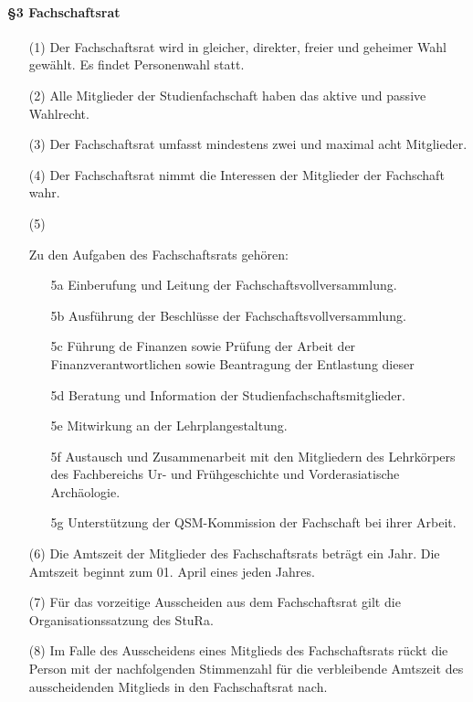     \paragraph{§3 Fachschaftsrat}
    \begin{enumerate}
        \item[(1)] { Der Fachschaftsrat wird in gleicher, direkter, freier und geheimer Wahl gewählt.        Es findet Personenwahl statt.}
        \item[(2)] {Alle Mitglieder der Studienfachschaft haben das aktive und passive Wahlrecht. }
        \item[(3)] {Der Fachschaftsrat umfasst mindestens zwei und maximal acht Mitglieder. }
        \item[(4)] {Der Fachschaftsrat nimmt die Interessen der Mitglieder der Fachschaft wahr. }
        \item[(5)] {Zu den Aufgaben des Fachschaftsrats gehören:
            \begin{enumerate}
                \item[5a]Einberufung und Leitung der Fachschaftsvollversammlung.
                \item[5b]Ausführung der Beschlüsse der Fachschaftsvollversammlung.
                \item[5c]Führung de Finanzen sowie Prüfung der Arbeit der Finanzverantwortlichen sowie Beantragung der Entlastung dieser
                \item[5d]Beratung und Information der Studienfachschaftsmitglieder.
                \item[5e]Mitwirkung an der Lehrplangestaltung.
                \item[5f]Austausch und Zusammenarbeit mit den Mitgliedern des Lehrkörpers des Fachbereichs Ur- und Frühgeschichte und Vorderasiatische Archäologie.
                \item[5g]Unterstützung der QSM-Kommission der Fachschaft bei ihrer Arbeit.
            \end{enumerate}
        }
        \item[(6)] {Die Amtszeit der Mitglieder des Fachschaftsrats beträgt ein Jahr. Die Amtszeit        beginnt zum 01. April eines jeden Jahres.}
        \item[(7)] {Für das vorzeitige Ausscheiden aus dem Fachschaftsrat gilt die        Organisationssatzung des StuRa.}
        \item[(8)] {Im Falle des Ausscheidens eines Mitglieds des Fachschaftsrats rückt die Person        mit der nachfolgenden Stimmenzahl für die verbleibende Amtszeit des ausscheidenden        Mitglieds in den Fachschaftsrat nach.}
    \end{enumerate}
